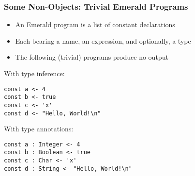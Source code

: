 \begin{frame}[fragile]

\frametitle{Some Non-Objects: Trivial Emerald Programs}

\begin{itemize}

\item An Emerald program is a list of constant declarations

\item Each bearing a name, an expression, and optionally, a type

\item The following (trivial) programs produce no output

\end{itemize}

With type inference:

\begin{lstlisting}
const a <- 4
const b <- true
const c <- 'x'
const d <- "Hello, World!\n"
\end{lstlisting}

With type annotations:

\begin{lstlisting}
const a : Integer <- 4
const b : Boolean <- true
const c : Char <- 'x'
const d : String <- "Hello, World!\n"
\end{lstlisting}

\end{frame}
